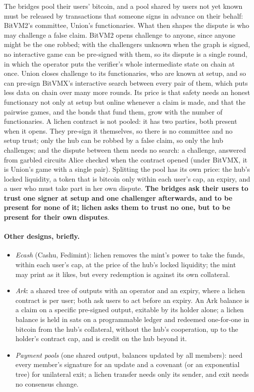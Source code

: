 \documentclass[11pt]{article}
\begin{document}
The bridges pool their users' bitcoin, and a pool shared by users not
yet known must be released by transactions that someone signs in
advance on their behalf: BitVM2's committee, Union's functionaries.
What then shapes the dispute is who may challenge a false claim. BitVM2
opens challenge to anyone, since anyone might be the one robbed; with
the challengers unknown when the graph is signed, no interactive game
can be pre-signed with them, so its dispute is a single round, in which
the operator puts the verifier's whole intermediate state on chain at
once. Union closes challenge to its functionaries, who are known at
setup, and so can pre-sign BitVMX's interactive search between every
pair of them, which puts less data on chain over many more rounds. Its
price is that safety needs an honest functionary not only at setup but
online whenever a claim is made, and that the pairwise games, and the
bonds that fund them, grow with the number of functionaries. A lichen
contract is not pooled: it has two parties, both present when it opens.
They pre-sign it themselves, so there is no committee and no setup
trust; only the hub can be robbed by a false claim, so only the hub
challenges; and the dispute between them needs no search: a challenge,
answered from garbled circuits Alice checked when the contract opened
(under BitVMX, it is Union's game with a single pair). Splitting the pool has its own price: the hub's locked liquidity,
a token that is bitcoin only within each user's cap, an expiry, and a
user who must take part in her own dispute. \textbf{The bridges ask their users
to trust one signer at setup and one challenger afterwards, and to be
present for none of it; lichen asks them to trust no one, but to be
present for their own disputes}.

\paragraph{Other designs, briefly.}
\begin{itemize}[leftmargin=1.5em]
\item \emph{Ecash} (Cashu, Fedimint): lichen removes the mint's power to
  take the funds, within each user's cap, at the price of the hub's
  locked liquidity; the mint may print as it likes, but every redemption
  is against its own collateral.
\item \emph{Ark}: a shared tree of outputs with an operator and an
  expiry, where a lichen contract is per user; both ask users to act
  before an expiry. An Ark balance is a claim on a specific pre-signed
  output, exitable by its holder alone; a lichen balance is held in sats
  on a programmable ledger and redeemed one-for-one in bitcoin from the
  hub's collateral, without the hub's cooperation, up to the holder's
  contract cap, and is credit on the hub beyond it.
\item \emph{Payment pools} (one shared output, balances updated by all
  members): need every member's signature for an update and a covenant
  (or an exponential tree) for unilateral exit; a lichen transfer needs
  only its sender, and exit needs no consensus change.
\end{itemize}
\end{document}
